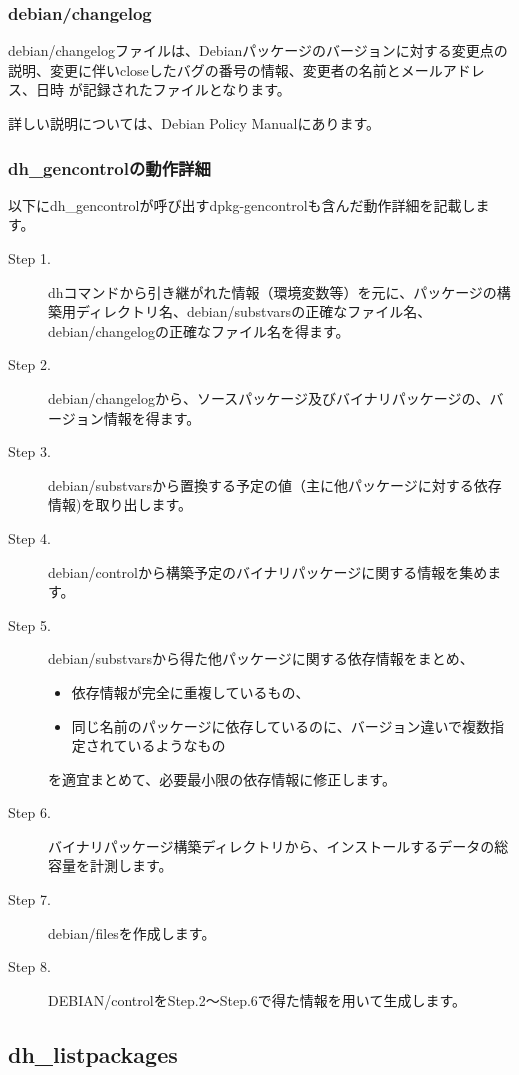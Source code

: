 \documentclass[mingoth,a4paper]{jsarticle}
\begin{document}
\subsubsection{debian/changelog}

 debian/changelogファイルは、Debianパッケージのバージョンに対する変更点の
説明、変更に伴いcloseしたバグの番号の情報、変更者の名前とメールアドレス、日時
が記録されたファイルとなります。

 詳しい説明については、Debian Policy Manual\cite{debpolicy}にあります。

\subsubsection{dh\_gencontrolの動作詳細}

 以下にdh\_gencontrolが呼び出すdpkg-gencontrolも含んだ動作詳細を記載します。

\begin{description}
\item [Step 1.] dhコマンドから引き継がれた情報（環境変数等）を元に、パッケージの構築用ディレクトリ名、debian/substvarsの正確なファイル名、debian/changelogの正確なファイル名を得ます。
\item [Step 2.] debian/changelogから、ソースパッケージ及びバイナリパッケージの、バージョン情報を得ます。
\item [Step 3.] debian/substvarsから置換する予定の値（主に他パッケージに対する依存情報)を取り出します。
\item [Step 4.] debian/controlから構築予定のバイナリパッケージに関する情報を集めます。
\item [Step 5.] debian/substvarsから得た他パッケージに関する依存情報をまとめ、
  \begin{itemize}
    \item 依存情報が完全に重複しているもの、
    \item 同じ名前のパッケージに依存しているのに、バージョン違いで複数指定されているようなもの
  \end{itemize}
  を適宜まとめて、必要最小限の依存情報に修正します。
\item [Step 6.] バイナリパッケージ構築ディレクトリから、インストールするデータの総容量を計測します。
\item [Step 7.] debian/filesを作成します。
\item [Step 8.] DEBIAN/controlをStep.2〜Step.6で得た情報を用いて生成します。
\end{description} 

\subsection{dh\_listpackages}
\end{document}
